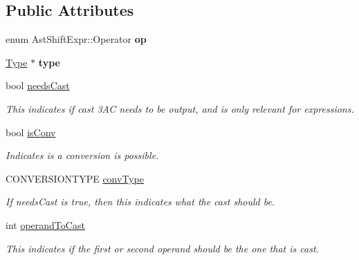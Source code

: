 \subsection*{Public Attributes}
\begin{DoxyCompactItemize}
\item 
\hypertarget{classAstShiftExpr_a930c123ccfe9e9f45bc3001e84b119e0}{enum Ast\-Shift\-Expr\-::\-Operator {\bfseries op}}\label{classAstShiftExpr_a930c123ccfe9e9f45bc3001e84b119e0}

\item 
\hypertarget{classAstShiftExpr_a5951d9343e6671ffe7399d7a144f4848}{\hyperlink{classType}{Type} $\ast$ {\bfseries type}}\label{classAstShiftExpr_a5951d9343e6671ffe7399d7a144f4848}

\item 
\hypertarget{classAST_aaf215802de409f8096c063d01ffa6783}{bool \hyperlink{classAST_aaf215802de409f8096c063d01ffa6783}{needs\-Cast}}\label{classAST_aaf215802de409f8096c063d01ffa6783}

\begin{DoxyCompactList}\small\item\em This indicates if cast 3\-A\-C needs to be output, and is only relevant for expressions. \end{DoxyCompactList}\item 
\hypertarget{classAST_afa9e77ef650ec6664458fa6cb55be985}{bool \hyperlink{classAST_afa9e77ef650ec6664458fa6cb55be985}{is\-Conv}}\label{classAST_afa9e77ef650ec6664458fa6cb55be985}

\begin{DoxyCompactList}\small\item\em Indicates is a conversion is possible. \end{DoxyCompactList}\item 
\hypertarget{classAST_a61ef3317e023d45237e06615b387cd6b}{C\-O\-N\-V\-E\-R\-S\-I\-O\-N\-T\-Y\-P\-E \hyperlink{classAST_a61ef3317e023d45237e06615b387cd6b}{conv\-Type}}\label{classAST_a61ef3317e023d45237e06615b387cd6b}

\begin{DoxyCompactList}\small\item\em If needs\-Cast is true, then this indicates what the cast should be. \end{DoxyCompactList}\item 
\hypertarget{classAST_aea9b07b39d24183f38c0029cec0a878e}{int \hyperlink{classAST_aea9b07b39d24183f38c0029cec0a878e}{operand\-To\-Cast}}\label{classAST_aea9b07b39d24183f38c0029cec0a878e}

\begin{DoxyCompactList}\small\item\em This indicates if the first or second operand should be the one that is cast. \end{DoxyCompactList}\end{DoxyCompactItemize}
